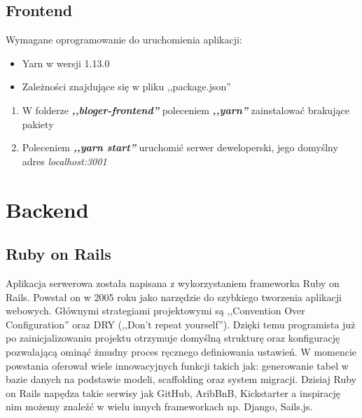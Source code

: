 \documentclass[declaration,shortabstract]{iithesis}
\begin{document}
\subsection{Frontend}
Wymagane oprogramowanie do uruchomienia aplikacji:
    \begin{itemize}
        \item Yarn w wersji 1.13.0
        \item Zależności znajdujące się w pliku ,,package.json'' 
    \end{itemize}

\begin{enumerate}
    \item W folderze \textbf{\textit{,,bloger-frontend''}} poleceniem \textbf{\textit{,,yarn''}} zainstalować brakujące pakiety
    \item Poleceniem \textbf{\textit{,,yarn start''}} uruchomić serwer deweloperski, jego domyślny adres \textit{localhost:3001}
\end{enumerate}

\section{Backend}
\subsection{Ruby on Rails}
Aplikacja serwerowa została napisana z wykorzystaniem frameworka Ruby on Rails. Powstał on w 2005 roku jako narzędzie do szybkiego tworzenia aplikacji webowych. Głównymi strategiami projektowymi są ,,Convention Over Configuration'' oraz DRY (,,Don't repeat yourself''). Dzięki temu programista już po zainicjalizowaniu projektu otrzymuje domyślną strukturę oraz konfigurację pozwalającą ominąć żmudny proces ręcznego definiowania ustawień. W momencie powstania oferował wiele innowacyjnych funkcji takich jak: generowanie tabel w bazie danych na podstawie modeli, scaffolding oraz system migracji. Dzisiaj Ruby on Rails napędza takie serwisy jak  GitHub, AribBnB, Kickstarter a inspirację nim możemy znaleźć w wielu innych frameworkach np. Django, Sails.js.
\end{document}
